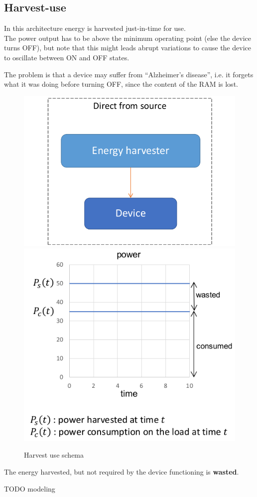 \subsection{Harvest-use}
\begin{paracol}{2}

   In this architecture energy is harvested just-in-time for use.\\
   The power output has to be above the minimum operating point (else the device turns OFF), 
   but note that this might leads abrupt variations to cause the device to oscillate between ON and OFF states.
   
   The problem is that a device may suffer from ``Alzheimer's disease'', i.e. it forgets what it was doing before turning OFF, since the content of the RAM is lost.
   
   \switchcolumn
   
   \begin{figure}[htbp]
      \centering
      \includegraphics[width=0.45\columnwidth]{images/harvestuse1.png}
      \includegraphics[width=0.45\columnwidth]{images/harvestuse2.png}
      \caption{Harvest use schema}
      \label{fig:harvestuse}
   \end{figure}
\end{paracol}

The energy harvested, but not required by the device functioning is \textbf{wasted}.

TODO modeling


